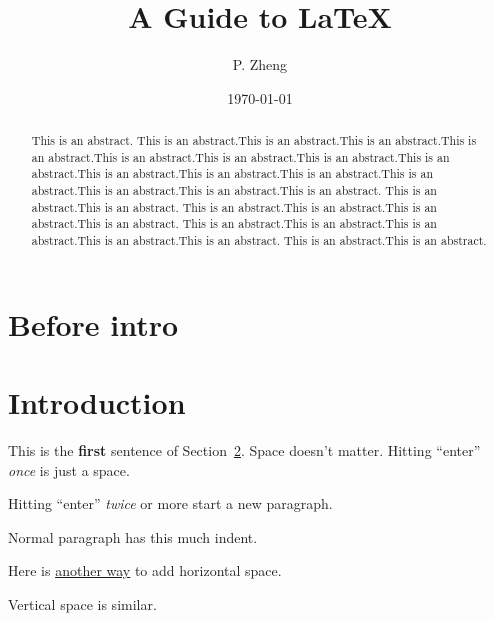 \documentclass{article}
\title{A Guide to \LaTeX}
\author{P. Zheng}
\date{\today}
\theoremstyle{definition}
\theoremstyle{remark}
\begin{document}
\maketitle

\begin{abstract}
   This is an abstract. This is an abstract.This is an abstract.This is an abstract.This is an abstract.This is an abstract.This is an abstract.This is an abstract.This is an abstract.This is an abstract.This is an abstract.This is an abstract.This is an abstract.This is an abstract.This is an abstract.This is an abstract. This is an abstract.This is an abstract. This is an abstract.This is an abstract.This is an abstract.This is an abstract. This is an abstract.This is an abstract.This is an abstract.This is an abstract.This is an abstract. This is an abstract.This is an abstract.
\end{abstract}

\newpage

\tableofcontents

\newpage

\listoffigures

\newpage

\listoftables

\newpage
{}

\section{Before intro}

\section{Introduction}\label{section:intro}

This is the {\bf first} sentence of Section~\ref{section:intro}.
Space                              doesn't matter. Hitting ``enter'' {\it once} is just a space.

\noindent Hitting ``enter'' {\em twice} or more start a new paragraph. 

Normal paragraph has this much indent.

\quad\quad{}

\hspace{4 em} Here is \underline{another way} to add horizontal space.

\vspace{2 em}

Vertical space is similar.
\end{document}
